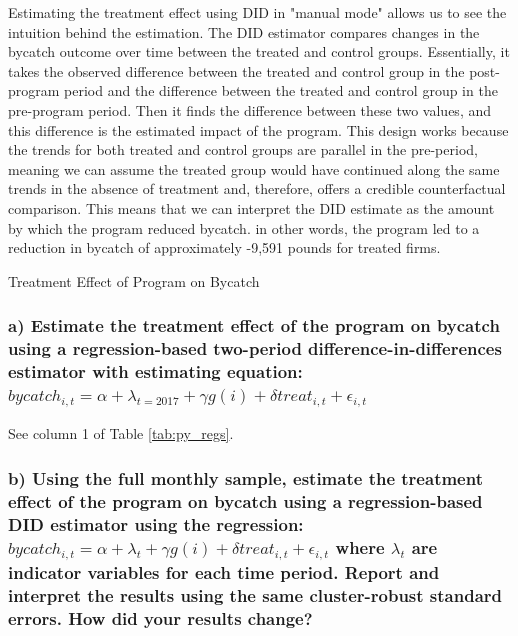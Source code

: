 \documentclass{article}
\begin{document}
Estimating the treatment effect using DID in "manual mode" allows us to see the intuition behind the estimation. The DID estimator compares changes in the bycatch outcome over time between the treated and control groups. Essentially, it takes the observed difference between the treated and control group in the post-program period and the difference between the treated and control group in the pre-program period. Then it finds the difference between these two values, and this difference is the estimated impact of the program. This design works because the trends for both treated and control groups are parallel in the pre-period, meaning we can assume the treated group would have continued along the same trends in the absence of treatment and, therefore, offers a credible counterfactual comparison. This means that we can interpret the DID estimate as the amount by which the program reduced bycatch. in other words, the program led to a reduction in bycatch of approximately -9,591 pounds for treated firms. 

\begin{table}[ht]
\centering
\caption{Treatment Effect of Program on Bycatch}
\vspace{0.3cm}
\begin{threeparttable}

\end{threeparttable}  
\label{tab:did_est}
\end{table}

\subsubsection*{a) Estimate the treatment effect of the program on bycatch using a regression-based two-period difference-in-differences estimator with estimating equation: $bycatch_{i,t} = \alpha + \lambda_{t=2017} + \gamma g(i) + \delta treat_{i,t} + \epsilon_{i,t}$}

See column 1 of Table \ref{tab:py_regs}.

\subsubsection*{b) Using the full monthly sample, estimate the treatment effect of the program on bycatch using a regression-based DID estimator using the regression: $bycatch_{i,t} = \alpha + \lambda_t + \gamma g(i) + \delta treat_{i,t} + \epsilon_{i,t}$ where $\lambda_t$ are indicator variables for each time period. Report and interpret the results using the same cluster-robust standard errors. How did your results change?}
\end{document}
